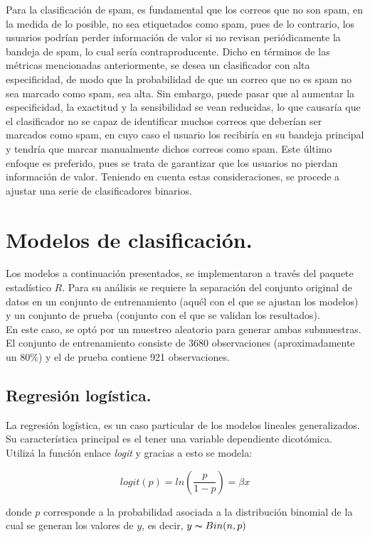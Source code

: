 \documentclass[12pt, letterpaper]{article}
\begin{document}
Para la clasificación de spam, es fundamental que los correos que no son spam, en la medida de lo posible, no sea etiquetados como spam, pues de lo contrario, los usuarios podrían perder información de valor si no revisan periódicamente la bandeja de spam, lo cual sería contraproducente. Dicho en términos de las métricas mencionadas anteriormente, se desea un clasificador con alta especificidad, de modo que la probabilidad de que un correo que no es spam no sea marcado como spam, sea alta. Sin embargo, puede pasar que al aumentar la especificidad, la exactitud y la sensibilidad se vean reducidas, lo que causaría que el clasificador no se capaz de identificar muchos correos que deberían ser marcados como spam, en cuyo caso el usuario los recibiría en su bandeja principal y tendría que marcar manualmente dichos correos como spam. Este último enfoque es preferido, pues se trata de garantizar que los usuarios no pierdan información de valor. Teniendo en cuenta estas consideraciones, se procede a ajustar una serie de clasificadores binarios.


\section{Modelos de clasificación.}

Los modelos a continuación presentados, se implementaron a través del paquete estadístico $R$. Para su análisis se requiere la separación del conjunto original de datos en un conjunto de entrenamiento (aquél con el que se ajustan los modelos) y un conjunto de prueba (conjunto con el que se validan los resultados).\\

En este caso, se optó por un muestreo aleatorio para generar ambas submuestras. El conjunto de entrenamiento consiste de 3680 observaciones (aproximadamente un $80\%$) y el de prueba contiene 921 observaciones.

\subsection{Regresión logística.}
La regresión logística, es un caso particular de los modelos lineales generalizados. Su característica principal es el tener una variable dependiente dicotómica. Utilizá la función enlace \emph{logit} y gracias a esto se modela:

$$logit(p)=ln(\dfrac{p}{1-p})=\beta x$$

donde $p$ corresponde a la probabilidad asociada a la distribución binomial de la cual se generan los valores de $y$, es decir, $y\thicksim Bin(n,p)$\\
\end{document}
